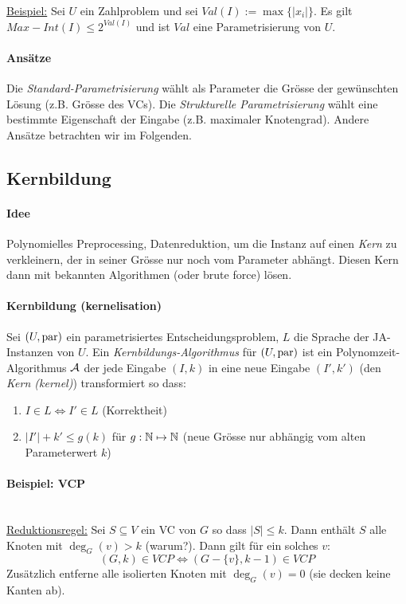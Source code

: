 \underline{Beispiel:}
Sei $U$ ein Zahlproblem und sei $Val(I) := \max \{ |x_i| \}$.
Es gilt $Max-Int(I) \leq 2^{Val(I)}$ und ist $Val$ eine Parametrisierung von $U$.

\paragraph{Ansätze}
Die \emph{Standard-Parametrisierung} wählt als Parameter die Grösse der gewünschten Lösung (z.B. Grösse des VCs).
Die \emph{Strukturelle Parametrisierung} wählt eine bestimmte Eigenschaft der Eingabe (z.B. maximaler Knotengrad).
Andere Ansätze betrachten wir im Folgenden.


\subsection{Kernbildung}

\paragraph{Idee}
Polynomielles Preprocessing, Datenreduktion, um die Instanz auf einen \emph{Kern} zu verkleinern,
der in seiner Grösse nur noch vom Parameter abhängt.
Diesen Kern dann mit bekannten Algorithmen (oder brute force) lösen.

\paragraph{Kernbildung (kernelisation)}
Sei $(U, \text{par})$ ein parametrisiertes Entscheidungsproblem, $L$ die Sprache der JA-Instanzen von $U$.
Ein \emph{Kernbildungs-Algorithmus} für $(U, \text{par})$ ist ein Polynomzeit-Algorithmus $\mathcal{A}$ der jede Eingabe $(I, k)$
in eine neue Eingabe $(I', k')$ (den \emph{Kern (kernel)}) transformiert so dass:
\begin{enumerate}[label=(\roman*)]
    \item $ I \in L \iff I' \in L $ (Korrektheit)
    \item $ |I'| + k' \leq g(k) $ für $g : \mathbb{N} \mapsto \mathbb{N}$ (neue Grösse nur abhängig vom alten Parameterwert $k$)
\end{enumerate}

\paragraph{Beispiel: VCP} \mbox{} \\
\underline{Reduktionsregel:}
Sei $S \subseteq V$ ein VC von $G$ so dass $|S| \leq k$. Dann enthält $S$ alle Knoten mit $\deg_G(v) > k$ (warum?).
Dann gilt für ein solches $v$:
$$ (G, k) \in VCP \iff (G-\{v\}, k-1) \in VCP $$
Zusätzlich entferne alle isolierten Knoten mit $\deg_G(v) = 0$ (sie decken keine Kanten ab).

